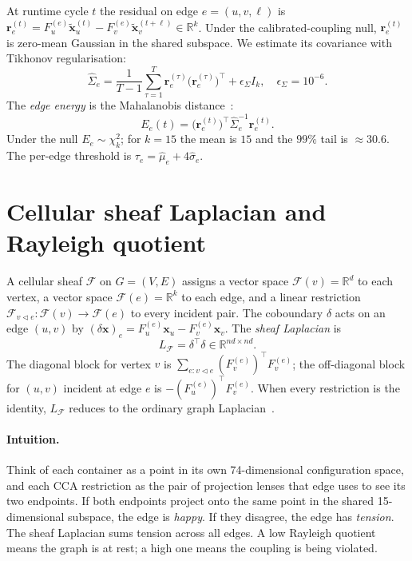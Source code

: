 At runtime cycle $t$ the residual on edge $e = (u, v, \ell)$ is
$\mathbf{r}_e^{(t)} = F_u^{(e)} \tilde{\mathbf{x}}_u^{(t)} - F_v^{(e)}
\tilde{\mathbf{x}}_v^{(t+\ell)} \in \mathbb{R}^k$. Under the
calibrated-coupling null, $\mathbf{r}_e^{(t)}$ is zero-mean Gaussian in the
shared subspace. We estimate its covariance with Tikhonov regularisation:
\[
  \hat\Sigma_e = \frac{1}{T-1}\sum_{\tau=1}^{T}
  \mathbf{r}_e^{(\tau)}\bigl(\mathbf{r}_e^{(\tau)}\bigr)^{\!\top}
  + \epsilon_\Sigma I_k, \quad \epsilon_\Sigma = 10^{-6}.
\]
The \emph{edge energy} is the Mahalanobis distance~\cite{mahalanobis1936}:
\begin{equation}
  E_e(t) = \bigl(\mathbf{r}_e^{(t)}\bigr)^{\!\top} \hat\Sigma_e^{-1} \mathbf{r}_e^{(t)}.
  \label{eq:mahal}
\end{equation}
Under the null $E_e \sim \chi_k^2$; for $k{=}15$ the mean is $15$ and the
$99\%$ tail is $\approx 30.6$. The per-edge threshold is $\tau_e = \hat\mu_e
+ 4\hat\sigma_e$.

\section{Cellular sheaf Laplacian and Rayleigh quotient}
\label{sec:sheaf}

A cellular sheaf $\mathcal{F}$ on $G = (V, E)$ assigns a vector space
$\mathcal{F}(v) = \mathbb{R}^{d}$ to each vertex, a vector space
$\mathcal{F}(e) = \mathbb{R}^{k}$ to each edge, and a linear restriction
$\mathcal{F}_{v \triangleleft e} : \mathcal{F}(v) \to \mathcal{F}(e)$ to
every incident pair. The coboundary $\delta$ acts on an edge $(u, v)$ by
$(\delta \mathbf{x})_e = F_u^{(e)} \mathbf{x}_u - F_v^{(e)} \mathbf{x}_v$.
The \emph{sheaf Laplacian} is
\begin{equation}
  L_\mathcal{F} = \delta^{\!\top}\!\delta \in \mathbb{R}^{nd \times nd}.
  \label{eq:sheaf-laplacian}
\end{equation}
The diagonal block for vertex $v$ is $\sum_{e \colon v \triangleleft
e}(F_v^{(e)})^{\!\top} F_v^{(e)}$; the off-diagonal block for $(u,v)$
incident at edge $e$ is $-(F_u^{(e)})^{\!\top} F_v^{(e)}$. When every
restriction is the identity, $L_\mathcal{F}$ reduces to the ordinary graph
Laplacian~\cite{chung1997spectral}.

\paragraph{Intuition.}  Think of each container as a point in its own
74-dimensional configuration space, and each CCA restriction as the pair
of projection lenses that edge uses to see its two endpoints. If both
endpoints project onto the same point in the shared 15-dimensional
subspace, the edge is \emph{happy}. If they disagree, the edge has
\emph{tension}. The sheaf Laplacian sums tension across all edges. A low
Rayleigh quotient means the graph is at rest; a high one means the
coupling is being violated.

